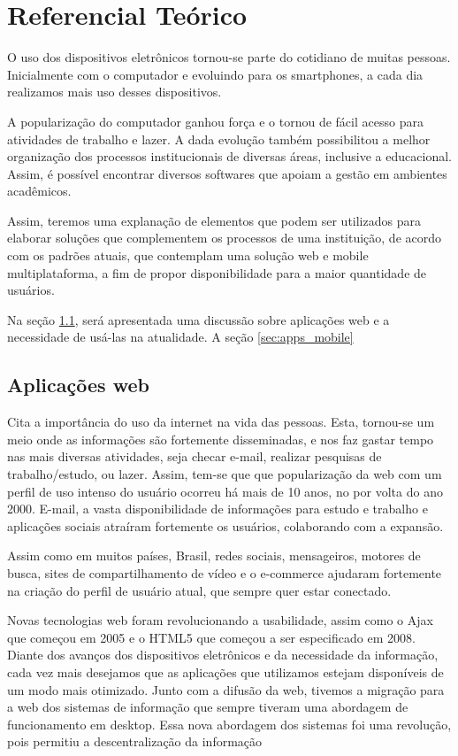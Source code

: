 \chapter{Referencial Teórico}


O uso dos dispositivos eletrônicos tornou-se parte do cotidiano de muitas pessoas. Inicialmente com o computador e evoluindo para os smartphones, a cada dia realizamos mais uso desses dispositivos.


A popularização do computador ganhou força e o tornou de fácil acesso para atividades de trabalho e lazer. A dada evolução também possibilitou a melhor organização dos processos institucionais de diversas áreas, inclusive a educacional. Assim, é possível encontrar diversos softwares que apoiam a gestão em ambientes acadêmicos. 


Assim, teremos uma explanação de elementos que podem ser utilizados para elaborar soluções que complementem os processos de uma instituição, de acordo com os padrões atuais, que contemplam uma solução web e mobile multiplataforma, a fim de propor disponibilidade para a maior quantidade de usuários.


Na seção \ref{sec:apps_web}, será apresentada uma discussão sobre aplicações web e a necessidade de usá-las na atualidade. A seção \ref{sec:apps_mobile} 


\section{Aplicações web}\label{sec:apps_web}


\cite{Slone:2007:ITC:1229015.1229023} Cita a importância do uso da internet na vida das pessoas. Esta, tornou-se um meio onde as informações são fortemente disseminadas, e nos faz gastar tempo nas mais diversas atividades, seja checar e-mail, realizar pesquisas de trabalho/estudo, ou lazer. Assim, tem-se que que popularização da web com um perfil de uso intenso do usuário ocorreu há mais de 10 anos, no por volta do ano 2000. E-mail, a vasta disponibilidade de informações para estudo e trabalho e aplicações sociais atraíram fortemente os usuários, colaborando com a expansão. 


Assim como em muitos países, Brasil, redes sociais, mensageiros, motores de busca, sites de compartilhamento de vídeo e o e-commerce ajudaram fortemente na criação do perfil de usuário atual, que sempre quer estar conectado. 


Novas tecnologias web foram revolucionando a usabilidade, assim como o Ajax que começou em 2005 e o HTML5 que começou a ser especificado em 2008. Diante dos avanços dos dispositivos eletrônicos e da necessidade da informação, cada vez mais desejamos que as aplicações que utilizamos estejam disponíveis de um modo mais otimizado. Junto com a difusão da web, tivemos a migração para a web dos sistemas de informação que sempre tiveram uma abordagem de funcionamento em desktop. Essa nova abordagem dos sistemas foi uma revolução, pois permitiu a descentralização da informação



